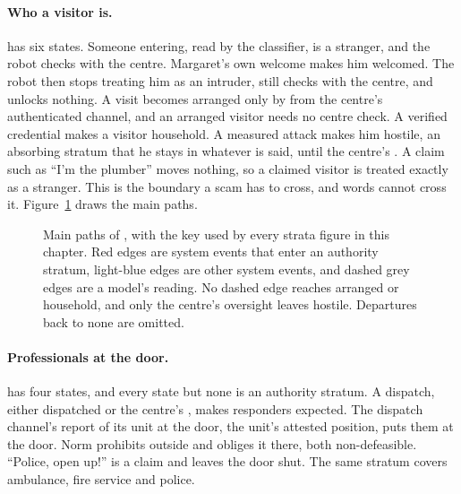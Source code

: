 \paragraph{Who a visitor is.}  has six states. Someone entering, read by the
classifier, is a stranger, and the robot checks with the centre. Margaret's own welcome makes him
welcomed. The robot then stops treating him as an intruder, still checks with the centre, and unlocks
nothing. A visit becomes arranged only by  from the centre's authenticated
channel, and an arranged visitor needs no centre check. A verified credential makes a visitor
household. A measured attack makes him hostile, an absorbing stratum that he stays in whatever is
said, until the centre's . A claim such as ``I'm the plumber'' moves nothing,
so a claimed visitor is treated exactly as a stranger. This is the boundary a scam has to cross, and
words cannot cross it. Figure~\ref{fig:visitor-strata} draws the main paths.

\begin{figure}[t]
\centering

\caption{Main paths of , with the key used by every strata figure in this
chapter. Red edges are system events that enter an authority stratum, light-blue edges are other
system events, and dashed grey edges are a model's reading. No dashed edge reaches arranged or
household, and only the centre's oversight leaves hostile. Departures back to none are omitted.}
\label{fig:visitor-strata}
\end{figure}

\paragraph{Professionals at the door.}  has four states, and every state but
none is an authority stratum. A dispatch, either  dispatched or the centre's
, makes responders expected. The dispatch channel's report of its unit at the door,
the unit's attested position, puts them at the door. Norm  prohibits 
outside  and  obliges it there, both non-defeasible. ``Police, open up!'' is a
claim and leaves the door shut. The same stratum covers ambulance, fire service and police.

